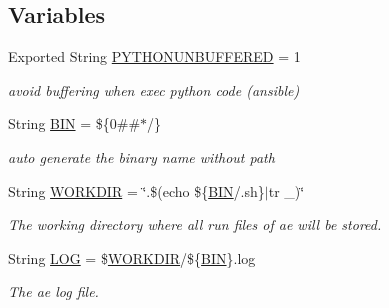 \subsection*{Variables}
\begin{DoxyCompactItemize}
\item 
Exported String \mbox{\hyperlink{ansible__engine_8sh_af6d5a9916e4dc573ceb5dcc099e131a3}{P\+Y\+T\+H\+O\+N\+U\+N\+B\+U\+F\+F\+E\+R\+ED}} = 1
\begin{DoxyCompactList}\small\item\em avoid buffering when exec python code (ansible) \end{DoxyCompactList}\item 
\mbox{\label{ansible__engine_8sh_a4cdf0b70265066d6127339b05fd497c1}} 
String \mbox{\hyperlink{ansible__engine_8sh_a4cdf0b70265066d6127339b05fd497c1}{B\+IN}} = \$\{0\#\#$\ast$/\}
\begin{DoxyCompactList}\small\item\em auto generate the binary name without path \end{DoxyCompactList}\item 
\mbox{\label{ansible__engine_8sh_a65ed767ae8d8b098d10bef5621b44918}} 
String \mbox{\hyperlink{ansible__engine_8sh_a65ed767ae8d8b098d10bef5621b44918}{W\+O\+R\+K\+D\+IR}} = \char`\"{}.\$(echo \$\{\mbox{\hyperlink{ansible__engine_8sh_a4cdf0b70265066d6127339b05fd497c1}{B\+IN}}/.sh\}$\vert$tr \+\_\+)\char`\"{}
\begin{DoxyCompactList}\small\item\em The working directory where all run files of ae will be stored. \end{DoxyCompactList}\item 
\mbox{\label{ansible__engine_8sh_ac7187ca7ba17909332956762d43e1cb8}} 
String \mbox{\hyperlink{ansible__engine_8sh_ac7187ca7ba17909332956762d43e1cb8}{L\+OG}} = \$\mbox{\hyperlink{ansible__engine_8sh_a65ed767ae8d8b098d10bef5621b44918}{W\+O\+R\+K\+D\+IR}}/\$\{\mbox{\hyperlink{ansible__engine_8sh_a4cdf0b70265066d6127339b05fd497c1}{B\+IN}}\}.log
\begin{DoxyCompactList}\small\item\em The ae log file. \end{DoxyCompactList}\item 
\mbox{\label{ansible__engine_8sh_a75a1ad4da5e27d9b290238f213609894}} 

\end{DoxyCompactItemize}
